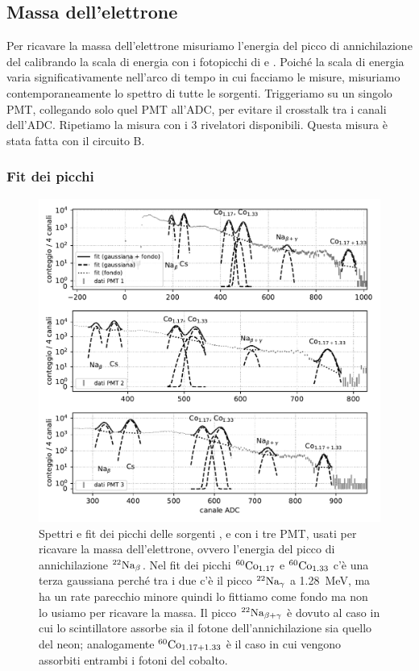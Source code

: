 \subsection{Massa dell'elettrone}

Per ricavare la massa dell'elettrone misuriamo l'energia del picco di annichilazione del \na{}
calibrando la scala di energia con i fotopicchi di \co{} e \cs{}.
Poiché la scala di energia varia significativamente nell'arco di tempo in cui facciamo le misure,
misuriamo contemporaneamente lo spettro di tutte le sorgenti.
Triggeriamo su un singolo PMT,
collegando solo quel PMT all'ADC, per evitare il crosstalk tra i canali dell'ADC.
Ripetiamo la misura con i 3 rivelatori disponibili.
Questa misura è stata fatta con il circuito B.

\subsubsection{Fit dei picchi}

\begin{figure}
	\includegraphics[width=\textwidth]{immagini/mass18-peaks}
	\caption{\label{fig:mass18-peaks}
	Spettri e fit dei picchi delle sorgenti \na{}, \cs{} e \co{} con i tre PMT,
	usati per ricavare la massa dell'elettrone,
	ovvero l'energia del picco di annichilazione $^{\text{22}}\text{Na}_\beta$.
	Nel fit dei picchi $^{\text{60}}\text{Co}_{1.17}$ e $^{\text{60}}\text{Co}_{1.33}$ c'è una terza gaussiana
	perché tra i due c'è il picco $^{\text{22}}\text{Na}_\gamma$ a \SI{1.28}{MeV},
	ma ha un rate parecchio minore quindi lo fittiamo come fondo ma non lo usiamo per ricavare la massa.
	Il picco $^{\text{22}}\text{Na}_{\beta+\gamma}$ è dovuto al caso in cui lo scintillatore
	assorbe sia il fotone dell'annichilazione sia quello del neon;
	analogamente $^{\text{60}}\text{Co}_{1.17+1.33}$ è il caso in cui vengono assorbiti entrambi i fotoni del cobalto.}
\end{figure}

